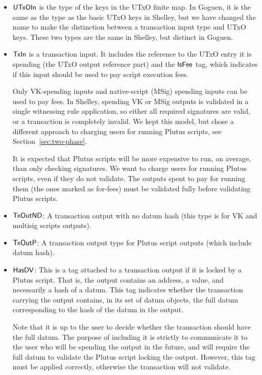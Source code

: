 \begin{itemize}
  \item $\mathsf{UTxOIn}$ is the type of the keys in the UTxO finite map. In Goguen, it is
  the same as the type as the basic UTxO keys in Shelley, but we have changed the name
  to make the distinction between a transaction input type and UTxO keys.
  These two types are the same in Shelley, but distinct in Goguen.

  \item $\mathsf{TxIn}$ is a transaction input. It includes the reference to the UTxO entry it is spending
  (the UTxO output reference part) and the $\mathsf{IsFee}$ tag, which indicates if this input should
  be used to pay script execution fees.

  Only VK-spending inputs and native-script (MSig)
  spending inputs can be used to
  pay fees. In Shelley, spending VK or MSig outputs is validated in a single witnessing
    rule application, so either all required signatures are valid, or a transaction
    is completely invalid. We kept this model, but chose a different approach to charging
    users for running Plutus scripts, see Section~\ref{sec:two-phase}.

    It is expected that Plutus scripts will be more
    expensive to run, on average, than only checking signatures. We want to
    charge users for running Plutus scripts, even if they do not validate. The
    outputs spent to pay for running them (the ones marked as for-fees) must
    be validated fully before validating Plutus scripts.

  \item $\mathsf{TxOutND}$: A transaction output with no datum hash
  (this type is for VK and multisig scripts outputs).

  \item $\mathsf{TxOutP}$: A transaction output type for Plutus
  script outputs (which include datum hash).

  \item $\mathsf{HasDV}$:
  This is a tag attached to a transaction output if it is locked by a Plutus
  script. That is, the output contains an address, a value, and necessarily a
  hash of a datum.
  This tag indicates whether the transaction carrying the output
  contains, in its set of datum objects, the full datum corresponding
  to the hash of the datum in the output.

  Note that it is up to the user
  to decide whether the transaction should have the full datum. The purpose of
  including it is strictly to communicate it to the user who will be spending
  the output in the future, and will require the full datum to validate
  the Plutus script locking the output. However, this tag must be applied
  correctly, otherwise the transaction will not validate.


\end{itemize}
